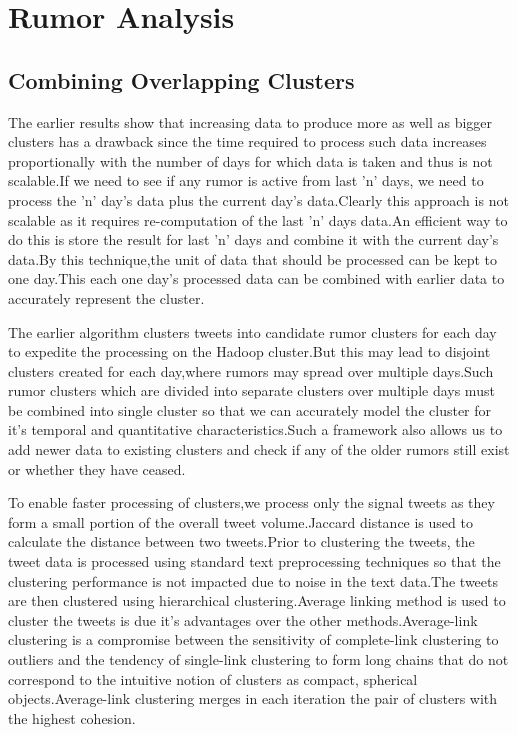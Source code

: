 \chapter{Rumor Analysis}

	\section{Combining Overlapping Clusters}	
	
	The earlier results show that increasing data to produce more as well as bigger clusters has a drawback since the time required to process such data increases proportionally with the number of days for which data is taken and thus is not scalable.If we need to see if any rumor is active from last 'n' days, we need to process the 'n' day's data plus the current day's data.Clearly this approach is not scalable as it requires re-computation of the last 'n' days data.An efficient way to do this is store the result for last 'n' days and combine it with the current day's data.By this technique,the unit of data that should be processed can be kept to one day.This each one day's processed data can be combined with earlier data to accurately represent the cluster.
	\\  
	\par 
	The earlier algorithm clusters tweets into candidate rumor clusters for each day to expedite the processing on the Hadoop cluster.But this may lead to disjoint clusters created for each day,where rumors may spread over multiple days.Such rumor clusters which are divided into separate clusters over multiple days must be combined into single cluster so that we can accurately model the cluster for it's temporal and quantitative  characteristics.Such a framework also allows us to add newer data  to existing clusters and check if any of the older rumors still exist or whether they have ceased.
	\\
	\par
	To enable faster processing of clusters,we process only the signal tweets as they form a small portion of the overall tweet volume.Jaccard distance is used to calculate the distance between two tweets.Prior to clustering the tweets, the tweet data is processed using standard text preprocessing techniques so that the clustering performance is not impacted due to noise in the text data.The tweets are then clustered using hierarchical clustering.Average linking method is used to cluster the tweets is due it's advantages over the other methods.Average-link clustering is a compromise between the sensitivity of complete-link clustering to outliers and the tendency of single-link clustering to form long chains that do not correspond to the intuitive notion of clusters as compact, spherical objects.Average-link clustering merges in each iteration the pair of clusters with the highest cohesion.
